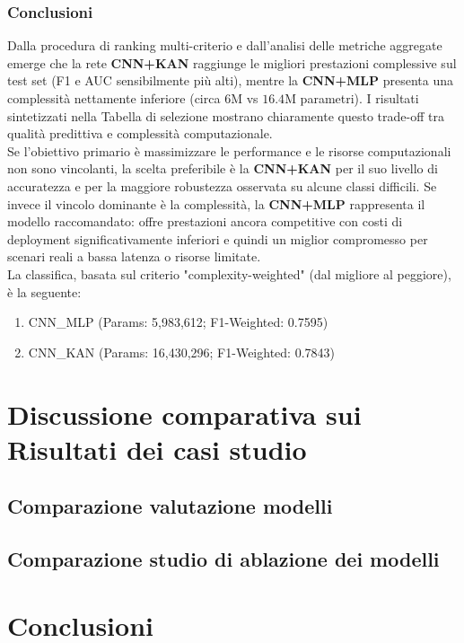 \documentclass[a4paper,12pt]{report}
\begin{document}
	\subsection{Conclusioni}
	
	Dalla procedura di ranking multi-criterio e dall'analisi delle metriche aggregate emerge che la rete \textbf{CNN+KAN} raggiunge le migliori prestazioni complessive sul test set (F1 e AUC sensibilmente più alti), mentre la \textbf{CNN+MLP} presenta una complessità nettamente inferiore (circa $6$M vs $16.4$M parametri). I risultati sintetizzati nella Tabella di selezione mostrano chiaramente questo trade-off tra qualità predittiva e complessità computazionale. \\
	Se l'obiettivo primario è massimizzare le performance e le risorse computazionali non sono vincolanti, la scelta preferibile è la \textbf{CNN+KAN} per il suo livello di accuratezza e per la maggiore robustezza osservata su alcune classi difficili. Se invece il vincolo dominante è la complessità, la \textbf{CNN+MLP} rappresenta il modello raccomandato: offre prestazioni ancora competitive con costi di deployment significativamente inferiori e quindi un miglior compromesso per scenari reali a bassa latenza o risorse limitate. \\
	La classifica, basata sul criterio "complexity-weighted" (dal migliore al peggiore), è la seguente:
	\begin{enumerate}
		\item CNN\_MLP \quad (Params: 5,983,612; F1-Weighted: 0.7595)
		\item CNN\_KAN \quad (Params: 16,430,296; F1-Weighted: 0.7843)
	\end{enumerate}
	
	\chapter{Discussione comparativa sui Risultati dei casi studio}
	
	\section{Comparazione valutazione modelli}
	
	\section{Comparazione studio di ablazione dei modelli}
	
	\chapter{Conclusioni}
	
\end{document}
